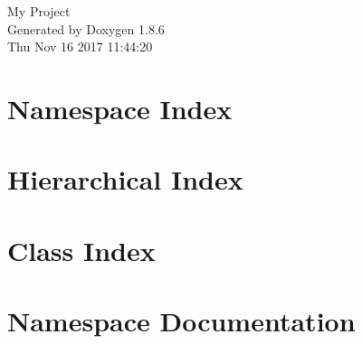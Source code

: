 \documentclass[twoside]{book}
\newcommand{\clearemptydoublepage}{%
  \newpage{\pagestyle{empty}\cleardoublepage}%
}
\begin{document}
\hypersetup{pageanchor=false}
\begin{titlepage}
\vspace*{7cm}
\begin{center}%
{\Large My Project }\\
\vspace*{1cm}
{\large Generated by Doxygen 1.8.6}\\
\vspace*{0.5cm}
{\small Thu Nov 16 2017 11:44:20}\\
\end{center}
\end{titlepage}
\clearemptydoublepage
\tableofcontents
\clearemptydoublepage
{}
\hypersetup{pageanchor=true}

\chapter{Namespace Index}

\chapter{Hierarchical Index}

\chapter{Class Index}

\chapter{Namespace Documentation}


\end{document}
